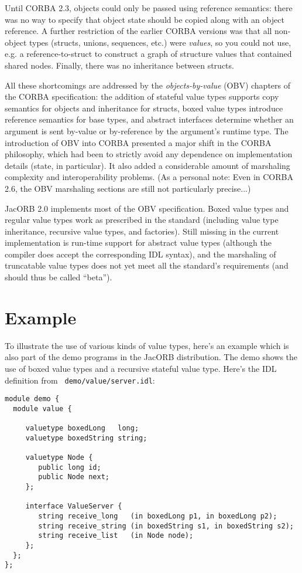 
Until CORBA 2.3, objects could only be passed using reference
semantics: there was no way to specify that object state should be
copied along with an object reference. A further restriction of the
earlier CORBA versions was that all non-object types (structs, unions,
sequences, etc.) were {\em values}, so you could not use, e.g. a
reference-to-struct to construct a graph of structure values that
contained shared nodes. Finally, there was no inheritance between
structs.

All these shortcomings are addressed by the {\em objects-by-value} (OBV)
chapters of the CORBA specification: the addition of stateful
value types supports copy semantics for objects and inheritance for
structs, boxed value types introduce reference semantics for base
types, and abstract interfaces determine whether an argument is sent
by-value or by-reference by the argument's runtime type. The
introduction of OBV into CORBA presented a major shift in the CORBA
philosophy, which had been to strictly avoid any dependence on
implementation details (state, in particular). It also added a
considerable amount of marshaling complexity and interoperability
problems. (As a personal note: Even in CORBA 2.6, the OBV marshaling
sections are still not particularly precise...)

JacORB 2.0 implements most of the OBV specification.  Boxed value
types and regular value types work as prescribed in the standard
(including value type inheritance, recursive value types, and
factories).  Still missing in the current implementation is run-time
support for abstract value types (although the compiler does accept
the corresponding IDL syntax), and the marshaling of truncatable
value types does not yet meet all the standard's requirements (and
should thus be called ``beta'').

\section{Example}

To illustrate the use of various kinds of value types, here's an
example which is also part of the demo programs in the JacORB
distribution.  The demo shows the use of boxed value types and a
recursive stateful value type. Here's the IDL definition from {\tt
demo/value/server.idl}:

\begin{verbatim}
module demo {
  module value {

     valuetype boxedLong   long;
     valuetype boxedString string;

     valuetype Node {
        public long id;
        public Node next;
     };

     interface ValueServer {
        string receive_long   (in boxedLong p1, in boxedLong p2);
        string receive_string (in boxedString s1, in boxedString s2);
        string receive_list   (in Node node);
     };
  };
};
\end{verbatim}

